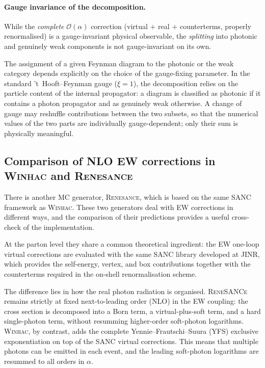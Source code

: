 \paragraph{Gauge invariance of the decomposition.}
While the \emph{complete} $\mathcal{O}(\alpha)$ correction (virtual $+$ real
$+$ counterterms, properly renormalised) is a gauge-invariant physical observable,
the \emph{splitting} into photonic and genuinely weak components is not gauge-invariant
on its own.

The assignment of a given Feynman diagram to the photonic or the weak
category depends explicitly on the choice of the gauge-fixing parameter.
In the standard 't~Hooft--Feynman gauge ($\xi=1$), the decomposition relies
on the particle content of the internal propagator: a diagram is classified as
photonic if it contains a photon propagator and as genuinely weak otherwise.
A change of gauge may reshuffle contributions between the two subsets, so that
the numerical values of the two parts are individually gauge-dependent;
only their sum is physically meaningful.

\subsection{Comparison of NLO EW corrections in \textsc{Winhac} and \textsc{Renesance}}
There is another MC generator, \textsc{Renesance}, which is based on the same \textsc{SANC} framework as \textsc{Winhac}. These two generators deal with EW corrections in different ways, and the comparison of their predictions provides a useful cross-check of the implementation.

At the parton level they share a common theoretical ingredient: the EW one-loop virtual corrections are evaluated with the same \textsc{SANC} library developed at JINR, which provides the self-energy, vertex, and box contributions together with the counterterms required in the on-shell renormalisation scheme. 

The difference lies in how the real photon radiation is organised. \textsc{ReneSANCe} remains strictly at fixed next-to-leading order (NLO) in the EW coupling: the cross section is decomposed into a Born term, a virtual-plus-soft term, and a hard single-photon term, without resumming higher-order soft-photon logarithms. \textsc{Winhac}, by contrast, adds the complete Yennie--Frautschi--Suura (YFS) exclusive exponentiation on top of the \textsc{SANC} virtual corrections. This means that multiple photons can be emitted in each event, and the leading soft-photon logarithms are resummed to all orders in $\alpha$.

